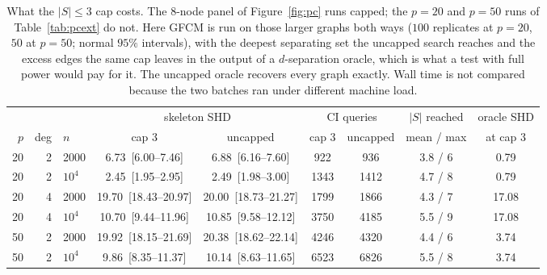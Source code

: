 \begin{table}[t]\centering\small
\caption{What the $|S|\le3$ cap costs. The $8$-node panel of Figure~\ref{fig:pc} runs capped; the $p=20$ and $p=50$ runs of Table~\ref{tab:pcext} do not. Here GFCM is run on those larger graphs both ways ($100$ replicates at $p=20$, $50$ at $p=50$; normal $95\%$ intervals), with the deepest separating set the uncapped search reaches and the excess edges the same cap leaves in the output of a $d$-separation oracle, which is what a test with full power would pay for it. The uncapped oracle recovers every graph exactly. Wall time is not compared because the two batches ran under different machine load.}
\label{tab:cap}
\begin{tabular}{rrlcccccc}
\toprule
& & & \multicolumn{2}{c}{skeleton SHD} & \multicolumn{2}{c}{CI queries} & $|S|$ reached & oracle SHD \\
\cmidrule(lr){4-5}\cmidrule(lr){6-7}
$p$ & deg & $n$ & cap $3$ & uncapped & cap $3$ & uncapped & mean / max & at cap $3$ \\
\midrule
20 & 2 & 2000 & 6.73~[6.00--7.46] & 6.88~[6.16--7.60] & 922 & 936 & 3.8 / 6 & 0.79 \\
20 & 2 & $10^4$ & 2.45~[1.95--2.95] & 2.49~[1.98--3.00] & 1343 & 1412 & 4.7 / 8 & 0.79 \\
20 & 4 & 2000 & 19.70~[18.43--20.97] & 20.00~[18.73--21.27] & 1799 & 1866 & 4.3 / 7 & 17.08 \\
20 & 4 & $10^4$ & 10.70~[9.44--11.96] & 10.85~[9.58--12.12] & 3750 & 4185 & 5.5 / 9 & 17.08 \\
50 & 2 & 2000 & 19.92~[18.15--21.69] & 20.38~[18.62--22.14] & 4246 & 4320 & 4.4 / 6 & 3.74 \\
50 & 2 & $10^4$ & 9.86~[8.35--11.37] & 10.14~[8.63--11.65] & 6523 & 6826 & 5.5 / 8 & 3.74 \\
\bottomrule
\end{tabular}
\end{table}
